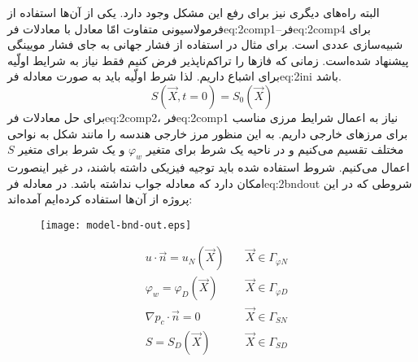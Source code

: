البته راه‌های دیگری نیز برای رفع این مشکل وجود دارد. یکی از آن‌ها استفاده از فرمولاسیونی متفاوت امّا معادل با معادلات  ‌فر{eq:2comp1}--‌فر{eq:2comp4}  برای شبیه‌سازی عددی است. برای مثال در  استفاده از فشار جهانی به جای فشار مویینگی پیشنهاد شده‌است.
زمانی که فاز‌ها را تراکم‌ناپذیر فرض کنیم فقط نیاز به شرایط اولّیه برای اشباع داریم. لذا شرط اولّیه باید به صورت معادله ‌فر{eq:2ini} باشد.
\begin{equation}
\label{eq:2ini}
S(\vec{X},t=0)=S_{0}(\vec{X})
\end{equation} 
برای حل معادلات ‌فر{eq:2comp2}، ‌فر{eq:2comp1} نیاز به اعمال شرایط مرزی مناسب برای مرزهای خارجی داریم. به این منظور مرز خارجی هندسه را مانند شکل  به نواحی مختلف تقسیم می‌کنیم و در ناحیه یک شرط برای متغیر $\varphi_w$ و یک شرط برای متغیر  $S$ اعمال می‌کنیم. شروط استفاده شده باید توجیه فیزیکی داشته باشند، در غیر اینصورت امکان دارد که معادله جواب نداشته باشد. در معادله ‌فر{eq:2bndout} شروطی که در این پروژه از آن‌ها استفاده کرده‌ایم آمده‌اند:
\begin{figure}
\texttt{[image: model-bnd-out.eps]}
\label{fig:2bndout}
\end{figure}
\begin{equation}
\label{eq:2bndout}
\begin{aligned}
&u \cdot \vec{n}
= u_N(\vec{X}) \quad 
&\vec{X} \in \Gamma_{\varphi N} \\
&\varphi_w = \varphi_D( \vec{X} ) \quad 
&\vec{X} \in \Gamma_{\varphi D} \\
&\nabla p_c \cdot \vec{n} = 0 \quad 
&\vec{X} \in \Gamma_{SN} \\
&S = S_D(\vec{X}) \quad 
&\vec{X} \in \Gamma_{SD} 
\end{aligned}
\end{equation}
